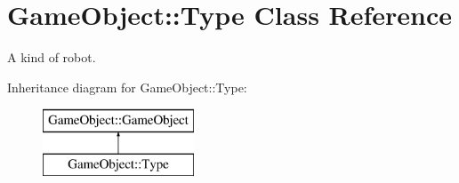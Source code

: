 \hypertarget{classGameObject_1_1Type}{
\section{GameObject::Type Class Reference}
\label{classGameObject_1_1Type}
}


A kind of robot.  


Inheritance diagram for GameObject::Type:\begin{figure}[H]
\begin{center}
\leavevmode
\includegraphics[height=2cm]{classGameObject_1_1Type}
\end{center}
\end{figure}
